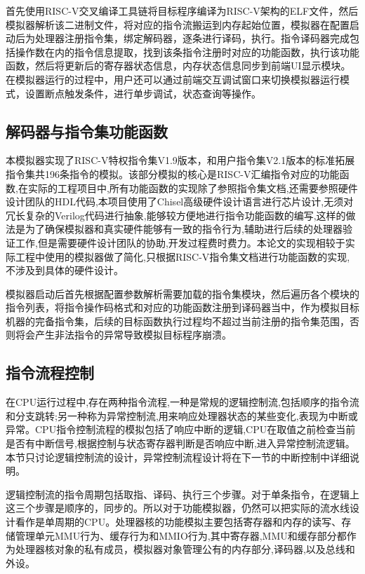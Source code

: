 首先使用RISC-V交叉编译工具链将目标程序编译为RISC-V架构的ELF文件，然后模拟器解析该二进制文件，将对应的指令流搬运到内存起始位置，模拟器在配置启动后为处理器注册指令集，绑定解码器，逐条进行译码，执行。指令译码器完成包括操作数在内的指令信息提取，找到该条指令注册时对应的功能函数，执行该功能函数，然后将更新后的寄存器状态信息，内存状态信息同步到前端UI显示模块。在模拟器运行的过程中，用户还可以通过前端交互调试窗口来切换模拟器运行模式，设置断点触发条件，进行单步调试，状态查询等操作。


\subsection{解码器与指令集功能函数}
本模拟器实现了RISC-V特权指令集V1.9版本，和用户指令集V2.1版本的标准拓展指令集共196条指令的模拟。该部分模拟的核心是RISC-V汇编指令对应的功能函数,在实际的工程项目中,所有功能函数的实现除了参照指令集文档,还需要参照硬件设计团队的HDL代码,本项目使用了Chisel高级硬件设计语言进行芯片设计,无须对冗长复杂的Verilog代码进行抽象,能够较方便地进行指令功能函数的编写,这样的做法是为了确保模拟器和真实硬件能够有一致的指令行为,辅助进行后续的处理器验证工作,但是需要硬件设计团队的协助,开发过程费时费力。本论文的实现相较于实际工程中使用的模拟器做了简化,只根据RISC-V指令集文档进行功能函数的实现,不涉及到具体的硬件设计。


模拟器启动后首先根据配置参数解析需要加载的指令集模块，然后遍历各个模块的指令列表，将指令操作码格式和对应的功能函数注册到译码器当中，作为模拟目标机器的完备指令集，后续的目标函数执行过程均不超过当前注册的指令集范围，否则将会产生非法指令的异常导致模拟目标程序崩溃。


\subsection{指令流程控制}
在CPU运行过程中,存在两种指令流程,一种是常规的逻辑控制流,包括顺序的指令流和分支跳转;另一种称为异常控制流,用来响应处理器状态的某些变化,表现为中断或异常。CPU指令控制流程的模拟包括了响应中断的逻辑,CPU在取值之前检查当前是否有中断信号,根据控制与状态寄存器判断是否响应中断,进入异常控制流逻辑。本节只讨论逻辑控制流的设计，异常控制流程设计将在下一节的中断控制中详细说明。


逻辑控制流的指令周期包括取指、译码、执行三个步骤。对于单条指令，在逻辑上这三个步骤是顺序的，同步的。所以对于功能模拟器，仍然可以把实际的流水线设计看作是单周期的CPU。处理器核的功能模拟主要包括寄存器和内存的读写、存储管理单元MMU行为、缓存行为和MMIO行为,其中寄存器,MMU和缓存部分都作为处理器核对象的私有成员，模拟器对象管理公有的内存部分,译码器,以及总线和外设。


